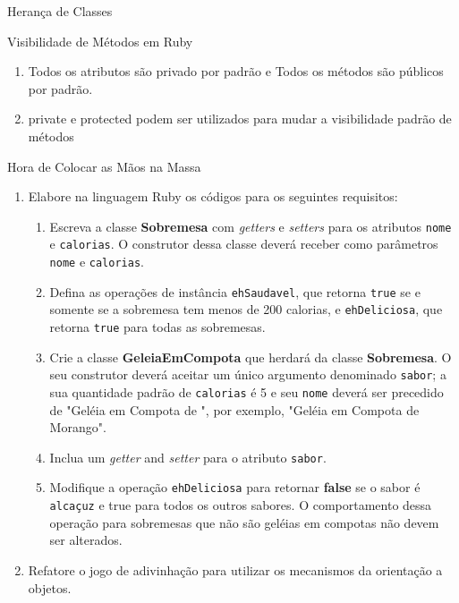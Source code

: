 \begin{frame}{Herança de Classes}    
  
 \end{frame}
\begin{frame}[fragile, t]{Visibilidade de Métodos em Ruby}
  \begin{enumerate}
    \item Todos os atributos são \alert{privado} por padrão e Todos os métodos
    são públicos por padrão.
    \item \alert{private} e \alert{protected} podem ser utilizados
    para mudar a visibilidade padrão de \alert{métodos}
  \end{enumerate}
\end{frame}
\begin{frame}{Hora de Colocar as Mãos na Massa}
  \begin{enumerate}
    \item Elabore na linguagem Ruby os códigos para os seguintes requisitos:
    \begin{enumerate}
          \item Escreva a classe \textbf{Sobremesa} com \textit{getters} e \textit{setters} para os atributos \texttt{nome} e \texttt{calorias}. O construtor dessa classe deverá receber como parâmetros \texttt{nome} e \texttt{calorias}.      
          \item Defina as operações de instância \texttt{ehSaudavel}, que retorna \texttt{true} se e somente se a sobremesa tem menos de 200 calorias, e \texttt{ehDeliciosa}, que retorna \texttt{true} para todas as sobremesas.
          \item Crie a classe \textbf{GeleiaEmCompota} que herdará da classe \textbf{Sobremesa}. O seu construtor deverá aceitar um único argumento denominado \texttt{sabor};  a sua quantidade padrão de \texttt{calorias} é 5 e seu \texttt{nome} deverá ser precedido de "Geléia em Compota de ", por exemplo, "Geléia em Compota de Morango".
          \item Inclua um \textit{getter} and \textit{setter} para o atributo \texttt{sabor}.   
          \item Modifique a operação \texttt{ehDeliciosa} para retornar \textbf{false} se o sabor é \texttt{alcaçuz} e true para todos os outros sabores. O comportamento dessa operação para sobremesas que não são geléias em compotas não devem ser alterados.
    \end{enumerate}  
    \item Refatore o jogo de adivinhação para utilizar os mecanismos da orientação a 
    objetos.  
  \end{enumerate}
\end{frame}


